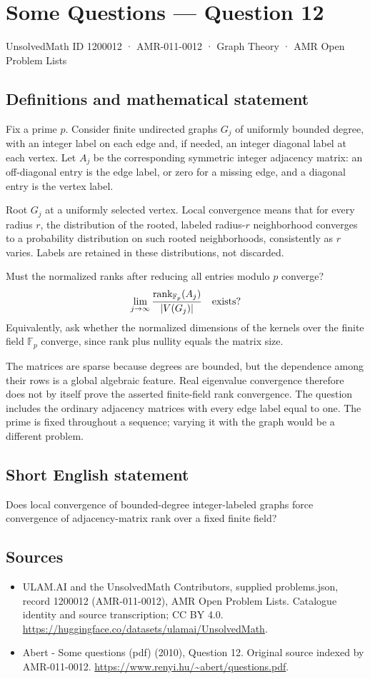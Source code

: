 \documentclass[11pt,a4paper]{article}
\begin{document}
\section*{Some Questions — Question 12}\label{1200012}
{\small UnsolvedMath ID 1200012 · AMR-011-0012 · Graph Theory · AMR Open Problem Lists}
\subsection{Definitions and mathematical statement}
Fix a prime $p$. Consider finite undirected graphs $G_j$ of uniformly bounded degree, with an integer label on each edge and, if needed, an integer diagonal label at each vertex. Let $A_j$ be the corresponding symmetric integer adjacency matrix: an off-diagonal entry is the edge label, or zero for a missing edge, and a diagonal entry is the vertex label.

Root $G_j$ at a uniformly selected vertex. Local convergence means that for every radius $r$, the distribution of the rooted, labeled radius-$r$ neighborhood converges to a probability distribution on such rooted neighborhoods, consistently as $r$ varies. Labels are retained in these distributions, not discarded.

Must the normalized ranks after reducing all entries modulo $p$ converge?
\[
 \lim_{j\to\infty}\frac{\operatorname{rank}_{\mathbb F_p}(A_j)}{|V(G_j)|}
                    \quad\hbox{exists?}
\]
Equivalently, ask whether the normalized dimensions of the kernels over the finite field $\mathbb F_p$ converge, since rank plus nullity equals the matrix size.

The matrices are sparse because degrees are bounded, but the dependence among their rows is a global algebraic feature. Real eigenvalue convergence therefore does not by itself prove the asserted finite-field rank convergence. The question includes the ordinary adjacency matrices with every edge label equal to one. The prime is fixed throughout a sequence; varying it with the graph would be a different problem.
\subsection{Short English statement}
Does local convergence of bounded-degree integer-labeled graphs force convergence of adjacency-matrix rank over a fixed finite field?
\subsection{Sources}
\begin{itemize}
\item[S1] ULAM.AI and the UnsolvedMath Contributors, supplied problems.json, record 1200012 (AMR-011-0012), AMR Open Problem Lists. Catalogue identity and source transcription; CC BY 4.0.
\url{https://huggingface.co/datasets/ulamai/UnsolvedMath}.
\item[S2] Abert - Some questions (pdf) (2010), Question 12. Original source indexed by AMR-011-0012.
\url{https://www.renyi.hu/~abert/questions.pdf}.
\end{itemize}
\end{document}
